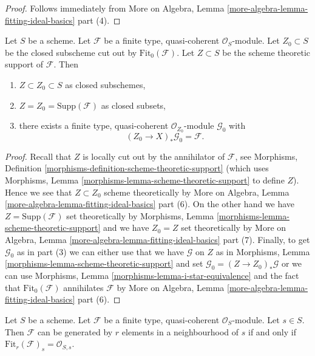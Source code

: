 \begin{proof}
Follows immediately from More on Algebra, Lemma
\ref{more-algebra-lemma-fitting-ideal-basics} part (4).
\end{proof}

\begin{lemma}
\label{lemma-on-subscheme-cut-out-by-Fit-0}
Let $S$ be a scheme.
Let $\mathcal{F}$ be a finite type, quasi-coherent $\mathcal{O}_S$-module.
Let $Z_0 \subset S$ be the closed subscheme cut out by
$\text{Fit}_0(\mathcal{F})$.
Let $Z \subset S$ be the scheme theoretic support of $\mathcal{F}$.
Then
\begin{enumerate}
\item $Z \subset Z_0 \subset S$ as closed subschemes,
\item $Z = Z_0 = \text{Supp}(\mathcal{F})$ as closed subsets,
\item there exists a finite type, quasi-coherent $\mathcal{O}_{Z_0}$-module
$\mathcal{G}_0$ with
$$
(Z_0 \to X)_*\mathcal{G}_0 = \mathcal{F}.
$$
\end{enumerate}
\end{lemma}

\begin{proof}
Recall that $Z$ is locally cut out by the annihilator of $\mathcal{F}$, see
Morphisms, Definition \ref{morphisms-definition-scheme-theoretic-support}
(which uses Morphisms, Lemma \ref{morphisms-lemma-scheme-theoretic-support}
to define $Z$). Hence we see that $Z \subset Z_0$ scheme theoretically
by More on Algebra, Lemma
\ref{more-algebra-lemma-fitting-ideal-basics} part (6).
On the other hand we have $Z = \text{Supp}(\mathcal{F})$
set theoretically by
Morphisms, Lemma \ref{morphisms-lemma-scheme-theoretic-support}
and we have $Z_0 = Z$ set theoretically by
More on Algebra, Lemma
\ref{more-algebra-lemma-fitting-ideal-basics} part (7).
Finally, to get $\mathcal{G}_0$ as in part (3) we can either use
that we have $\mathcal{G}$ on $Z$ as in
Morphisms, Lemma \ref{morphisms-lemma-scheme-theoretic-support}
and set $\mathcal{G}_0 = (Z \to Z_0)_*\mathcal{G}$
or we can use Morphisms, Lemma \ref{morphisms-lemma-i-star-equivalence}
and the fact that $\text{Fit}_0(\mathcal{F})$ annihilates
$\mathcal{F}$ by More on Algebra, Lemma
\ref{more-algebra-lemma-fitting-ideal-basics} part (6).
\end{proof}

\begin{lemma}
\label{lemma-fitting-ideal-generate-locally}
Let $S$ be a scheme. Let $\mathcal{F}$ be a finite type, quasi-coherent
$\mathcal{O}_S$-module. Let $s \in S$. Then $\mathcal{F}$ can be
generated by $r$ elements in a neighbourhood of $s$ if and only
if $\text{Fit}_r(\mathcal{F})_s = \mathcal{O}_{S, s}$.
\end{lemma}

